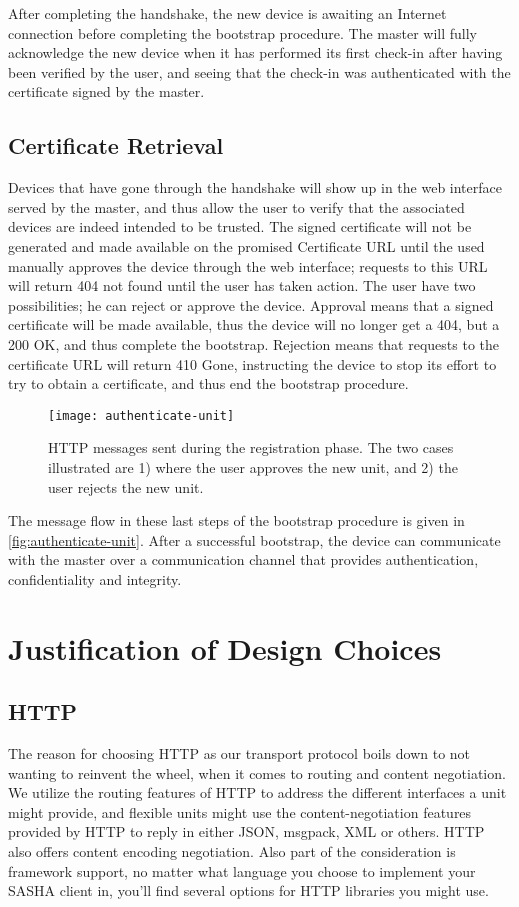 After completing the handshake, the new device is awaiting an Internet connection before completing the bootstrap procedure. The master will fully acknowledge the new device when it has performed its first check-in after having been verified by the user, and seeing that the check-in was authenticated with the certificate signed by the master.

\subsection{Certificate Retrieval}
Devices that have gone through the handshake will show up in the web interface served by the master, and thus allow the user to verify that the associated devices are indeed intended to be trusted. The signed certificate will not be generated and made available on the promised Certificate URL until the used manually approves the device through the web interface; requests to this URL will return 404 not found until the user has taken action.
The user have two possibilities; he can reject or approve the device. Approval means that a signed certificate will be made available, thus the device will no longer get a 404, but a 200 OK, and thus complete the bootstrap. Rejection means that requests to the certificate URL will return 410 Gone, instructing the device to stop its effort to try to obtain a certificate, and thus end the bootstrap procedure.

\begin{figure}[ht!]
    \centering
    \texttt{[image: authenticate-unit]}
    \caption{HTTP messages sent during the registration phase. The two cases illustrated are 1) where the user approves the new unit, and 2) the user rejects the new unit.}
    \label{fig:authenticate-unit}
\end{figure}

The message flow in these last steps of the bootstrap procedure is given in \autoref{fig:authenticate-unit}. After a successful bootstrap, the device can communicate with the master over a communication channel that provides authentication, confidentiality and integrity.


\section{Justification of Design Choices}

\subsection{HTTP}
The reason for choosing HTTP as our transport protocol boils down to not wanting to reinvent the wheel, when it comes to routing and content negotiation. We utilize the routing features of HTTP to address the different interfaces a unit might provide, and flexible units might use the content-negotiation features provided by HTTP to reply in either JSON, msgpack, XML or others. HTTP also offers content encoding negotiation. Also part of the consideration is framework support, no matter what language you choose to implement your SASHA client in, you'll find several options for HTTP libraries you might use.

